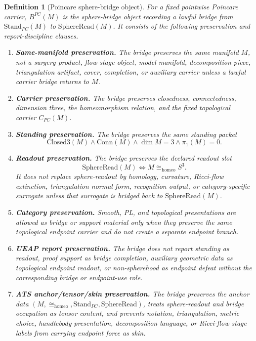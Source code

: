 \documentclass[11pt]{article}
\newtheorem{definition}[theorem]{Definition}
\newcommand{\Sthree}{S^{3}}
\newcommand{\ClosedThree}{\mathrm{Closed3}}
\newcommand{\Conn}{\mathrm{Conn}}
\newcommand{\StandPC}{\mathrm{Stand}_{PC}}
\newcommand{\SphereRead}{\mathrm{SphereRead}}
\newcommand{\CarrierPC}{C_{PC}}
\newcommand{\BridgeObjPC}{B^{PC}}
\newcommand{\Homeo}{\cong_{\mathrm{homeo}}}
\begin{document}
\begin{definition}[Poincare sphere-bridge object]\label{def:pc-bridge-object}
For a fixed pointwise Poincare carrier, \(\BridgeObjPC(M)\) is the sphere-bridge object recording a lawful bridge from \(\StandPC(M)\) to \(\SphereRead(M)\). It consists of the following preservation and report-discipline clauses.
\begin{enumerate}[label=\textup{(B\arabic*)}]
\item \textbf{Same-manifold preservation.} The bridge preserves the same manifold \(M\), not a surgery product, flow-stage object, model manifold, decomposition piece, triangulation artifact, cover, completion, or auxiliary carrier unless a lawful carrier bridge returns to \(M\).
\item \textbf{Carrier preservation.} The bridge preserves closedness, connectedness, dimension three, the homeomorphism relation, and the fixed topological carrier \(\CarrierPC(M)\).
\item \textbf{Standing preservation.} The bridge preserves the same standing packet
\[
\ClosedThree(M)\wedge\Conn(M)\wedge\dim M=3\wedge\pi_1(M)=0.
\]
\item \textbf{Readout preservation.} The bridge preserves the declared readout slot
\[
\SphereRead(M)\Longleftrightarrow M\Homeo\Sthree.
\]
It does not replace sphere-readout by homology, curvature, Ricci-flow extinction, triangulation normal form, recognition output, or category-specific surrogate unless that surrogate is bridged back to \(\SphereRead(M)\).
\item \textbf{Category preservation.} Smooth, PL, and topological presentations are allowed as bridge or support material only when they preserve the same topological endpoint carrier and do not create a separate endpoint branch.
\item \textbf{UEAP report preservation.} The bridge does not report standing as readout, proof support as bridge completion, auxiliary geometric data as topological endpoint readout, or non-spherehood as endpoint defeat without the corresponding bridge or endpoint-use role.
\item \textbf{ATS anchor/tensor/skin preservation.} The bridge preserves the anchor data \((M,\Homeo,\StandPC,\SphereRead)\), treats sphere-readout and bridge occupation as tensor content, and prevents notation, triangulation, metric choice, handlebody presentation, decomposition language, or Ricci-flow stage labels from carrying endpoint force as skin.
\end{enumerate}
\end{definition}
\end{document}
